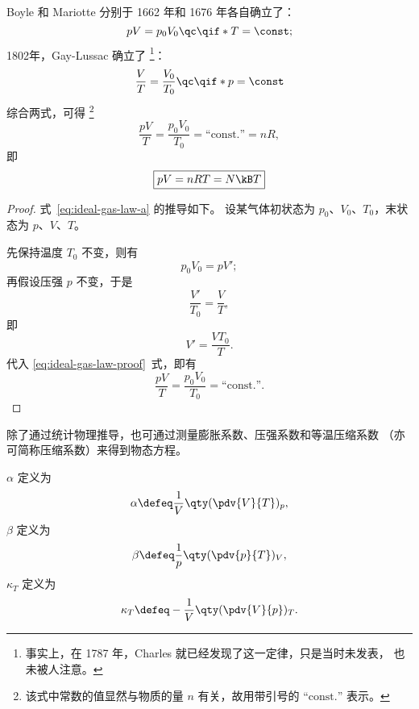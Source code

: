 Boyle 和 Mariotte 分别于 1662 年和 1676 年各自确立了：
\begin{equation}
  pV = p_0 V_0 \qc\qif* T = \const;
\end{equation}
1802年，Gay-Lussac 确立了
\footnote{事实上，在 1787 年，Charles 就已经发现了这一定律，只是当时未发表，
  也未被人注意。}：
\begin{equation}
  \frac{V}{T} = \frac{V_0}{T_0} \qc\qif* p = \const
\end{equation}
综合两式，可得
\footnote{该式中常数的值显然与物质的量 $n$ 有关，故用带引号的
  $\text{``const.''}$ 表示。}
\begin{equation} \label{eq:ideal-gas-law-a}
  \frac{p V}{T} = \frac{p_0 V_0}{T_0} = \text{``const.''} = n R,
\end{equation}
即
\begin{equation} \label{eq:ideal-gas-law-b}
  \boxed{pV = nRT = N \kB T}
\end{equation}

\begin{proof}
  式~\eqref{eq:ideal-gas-law-a} 的推导如下。
  设某气体初状态为 $p_0$、$V_0$、$T_0$，末状态为 $p$、$V$、$T$。

  先保持温度 $T_0$ 不变，则有
  \begin{equation} \label{eq:ideal-gas-law-proof}
    p_0 V_0 = p V';
  \end{equation}
  再假设压强 $p$ 不变，于是
  \begin{equation}
    \frac{V'}{T_0} = \frac{V}{T},
  \end{equation}
  即
  \begin{equation}
    V' = \frac{V T_0}{T}.
  \end{equation}
  代入 \eqref{eq:ideal-gas-law-proof}~式，即有
  \begin{equation}
    \frac{p V}{T} = \frac{p_0 V_0}{T_0} = \text{``const.''}.
  \end{equation}
\end{proof}

除了通过统计物理推导，也可通过测量膨胀系数、压强系数和等温压缩系数
（亦可简称压缩系数）来得到物态方程。

 $\alpha$ 定义为
\begin{equation}
  \alpha \defeq \frac{1}{V} \qty(\pdv{V}{T})_p,
\end{equation}
 $\beta$ 定义为
\begin{equation}
  \beta \defeq \frac{1}{p} \qty(\pdv{p}{T})_V,
\end{equation}
 $\kappa_T$ 定义为
\begin{equation}
  \kappa_T \defeq -\frac{1}{V} \qty(\pdv{V}{p})_T.
\end{equation}

